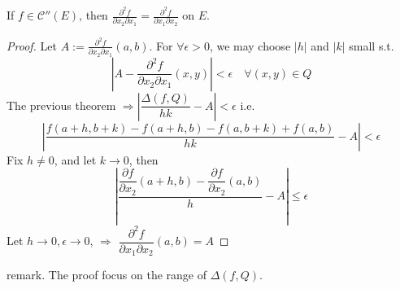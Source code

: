 \begin{corollary}
    If  $ f\in \mathscr{C}''(E) $, then  $  \frac{\partial^2 f}{\partial x_2\partial x_1} = \frac{\partial^2 f}{\partial x_1\partial x_2}  $ on  $ E  $.   
\end{corollary}
\begin{proof}
    Let  $ A:= \frac{\partial^2 f}{\partial x_2\partial x_1} (a,b) $. For  $ \forall\epsilon>0 $, we may choose  $ |h| $ and  $ |k| $ small s.t.
    \[\left|A- \dfrac{\partial^2 f}{\partial x_2\partial x_1}(x,y)\right|<\epsilon\quad\forall (x,y)\in Q \]
    The previous theorem  $ \Rightarrow\left|\dfrac{\Delta(f,Q)}{hk}-A\right|<\epsilon  $ i.e.
    \[\left|\dfrac{f(a+h,b+k)-f(a+h,b)-f(a,b+k)+f(a,b)}{hk}-A\right|<\epsilon\]
    Fix  $ h\not=0 $, and let  $ k\rightarrow 0 $, then 
    \[\left|\dfrac{\dfrac{\partial f}{\partial x_2}(a+h,b)-\dfrac{\partial f}{\partial x_2}(a,b)}{h}-A\right| \leqslant \epsilon\]   
    Let  $ h\rightarrow0 ,\epsilon\rightarrow0 $,  $ \Rightarrow  $  $ \dfrac{\partial^2 f}{\partial x_1\partial x_2} (a,b)=A $ 
\end{proof}
remark. The proof focus on  the range of $ \Delta(f,Q) $.  
